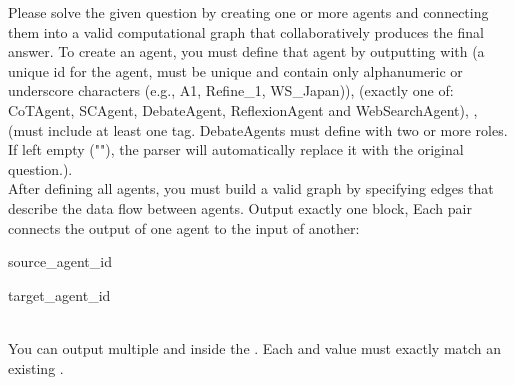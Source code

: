 \begin{userprompt}[title={User Prompt}]

Please solve the given question by creating one or more agents and connecting them into a valid computational graph that collaboratively produces the final answer. To create an agent, you must define that agent by outputting  with  (a unique id for the agent, must be unique and contain only alphanumeric or underscore characters (e.g., A1, Refine_1, WS_Japan)),  (exactly one of: CoTAgent, SCAgent, DebateAgent, ReflexionAgent and WebSearchAgent), ,  (must include at least one  tag. DebateAgents must define  with two or more roles. If   left empty (""), the parser will automatically replace it with the original question.). \\

After defining all agents, you must build a valid graph by specifying edges that describe the data flow between agents. Output exactly one  block, Each   pair connects the output of one agent to the input of another: \\


\quad{}source_agent_id

\quad{}target_agent_id

 \\

You can output multiple  and \texttt{} inside the . Each  and  value must exactly match an existing . \\


\end{userprompt}
